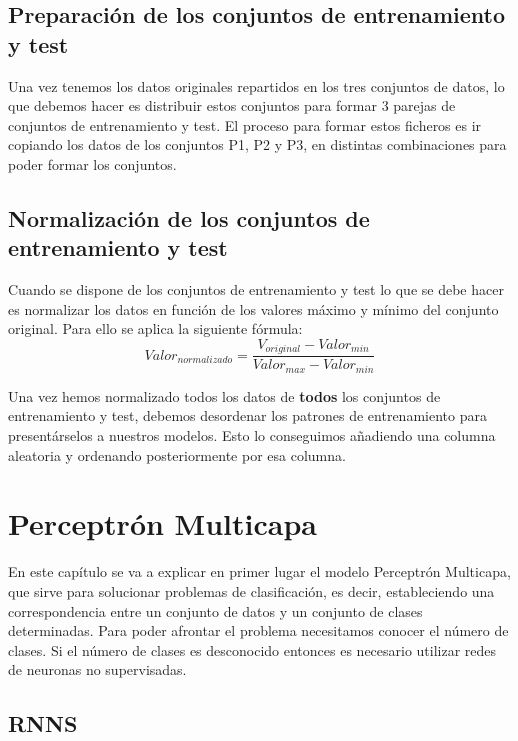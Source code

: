 \documentclass[11pt,spanish,listoffigures,listoftables]{workluis}
\begin{document}
\section{Preparación de los conjuntos de entrenamiento y test}

\par Una vez tenemos los datos originales repartidos en los tres conjuntos de datos, lo que debemos hacer es distribuir estos conjuntos para formar 3 parejas de conjuntos de entrenamiento y test. El proceso para formar estos ficheros es ir copiando los datos de los conjuntos P1, P2 y P3, en distintas combinaciones para poder formar los conjuntos.

\section{Normalización de los conjuntos de entrenamiento y test}

\par Cuando se dispone de los conjuntos de entrenamiento y test lo que se debe hacer es normalizar los datos en función de los valores máximo y mínimo del conjunto original. Para ello se aplica la siguiente fórmula:
\begin{equation}\label{eq:ej}
Valor_{normalizado} = \frac{V_{original} - Valor_{min}}{Valor_{max} - Valor_{min}}
\end{equation}

\par Una vez hemos normalizado todos los datos de \textbf{todos} los conjuntos de entrenamiento y test, debemos desordenar los patrones de entrenamiento para presentárselos a nuestros modelos. Esto lo conseguimos añadiendo una columna aleatoria y ordenando posteriormente por esa columna.

\chapter{Perceptrón Multicapa}

\par En este capítulo se va a explicar en primer lugar el modelo Perceptrón Multicapa, que sirve para solucionar problemas de clasificación, es decir, estableciendo una correspondencia entre un conjunto de datos y un conjunto de clases determinadas. Para poder afrontar el problema necesitamos conocer el número de clases. Si el número de clases es desconocido entonces es necesario utilizar redes de neuronas no supervisadas.

\section{RNNS}
\end{document}
